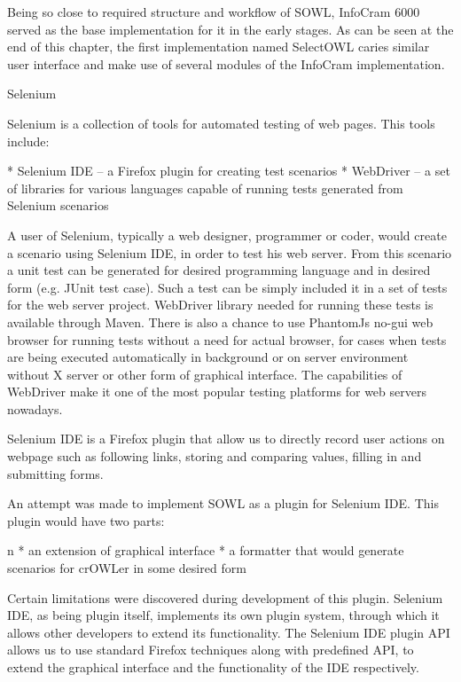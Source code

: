 Being so close to required structure and workflow of SOWL, InfoCram 6000 served
as the base implementation for it in the early stages. As can be seen at the end 
of this chapter, the first implementation named SelectOWL caries similar user
interface and make use of several modules of the InfoCram implementation. 


\secc Selenium

Selenium is a collection of tools for automated testing of web pages. This tools include: 

\begitems
  * Selenium IDE -- a Firefox plugin for creating test scenarios
  * WebDriver -- a set of libraries for various languages capable of running
    tests generated from Selenium scenarios
\enditems

A user of Selenium, typically a web designer, programmer or coder, would create
a scenario using Selenium IDE, in order to test his web server. From this
scenario a unit test can be generated for desired programming language and in
desired form (e.g. JUnit test case). Such a test can be simply included it in a
set of tests for the web server project. WebDriver library needed for running
these tests is available through Maven. There is also a chance to use PhantomJs
no-gui web browser for running tests without a need for actual browser, for
cases when tests are being executed automatically in background or on server
environment without X server or other form of graphical interface. The
capabilities of WebDriver make it one of the most popular testing platforms for
web servers nowadays. 

Selenium IDE is a Firefox plugin that allow us to directly record user actions
on webpage such as following links, storing and comparing values, filling in
and submitting forms. 

An attempt was made to implement SOWL as a plugin for Selenium IDE. This plugin
would have two parts: 

\begitems \style n
  * an extension of graphical interface
  * a formatter that would generate scenarios for crOWLer in some desired form
\enditems

Certain limitations were discovered during development of this plugin.
Selenium IDE, as being plugin itself, implements its own plugin system,
through which it allows other developers to extend its functionality. The
Selenium IDE plugin API allows us to use standard Firefox techniques along with
predefined API, to extend the graphical interface and the functionality of the
IDE respectively. 

